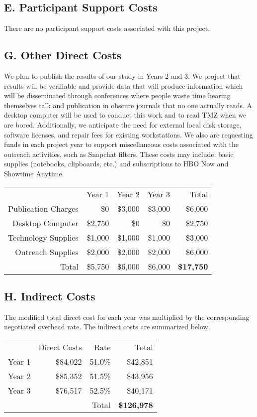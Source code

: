 \subsection*{E. Participant Support Costs}
There are no participant support costs associated with this project.

\subsection*{G. Other Direct Costs}
We plan to publish the results of our study in Years 2 and 3. We project that results will be verifiable and provide data that will produce information which will be disseminated through conferences where people waste time hearing themselves talk and publication in obscure journals that no one actually reads. A desktop computer will be used to conduct this work and to read TMZ when we are bored. Additionally, we anticipate the need for external local disk storage, software licenses, and repair fees for existing workstations. We also are requesting funds in each project year to support miscellaneous costs associated with the outreach activities, such as Snapchat filters.  These costs may include: basic supplies (notebooks, clipboards, etc.) and subscriptions to HBO Now and Showtime Anytime.
\newline
\begin{table}[H]
\begin{tabular}[c]{r r r r | r}
 & Year 1 & Year 2 & Year 3 & Total\\
Publication Charges     & \$0        & \$3,000    & \$3,000    & \$6,000\\
Desktop Computer        & \$2,750    & \$0        & \$0        & \$2,750\\
Technology Supplies     & \$1,000    & \$1,000    &\$1,000     & \$3,000\\
Outreach Supplies       & \$2,000    & \$2,000    &\$2,000     & \$6,000\\
\hline
Total                   & \$5,750   & \$6,000   & \$6,000 & \textbf{\$17,750}
\end{tabular}
\end{table}

\subsection*{H. Indirect Costs}

\noindent The modified total direct cost for each year was multiplied by the corresponding negotiated overhead rate. The indirect costs are summarized below.
\newline
\newline
\begin{table}[H]
\begin{tabular}[c]{r r r | r}
        & Direct Costs  & Rate      & Total\\
Year 1  & \$84,022      & 51.0\%    & \$42,851\\
Year 2  & \$85,352      & 51.5\%    & \$43,956\\ 
Year 3  & \$76,517      & 52.5\%    & \$40,171\\
\hline
        &               & Total     & \textbf{\$126,978}
\end{tabular}
\end{table}
